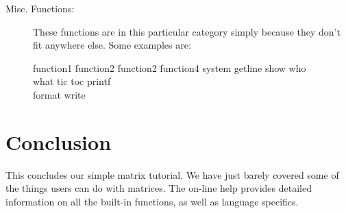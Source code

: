 \begin{description}
     \item[Misc. Functions:] These functions are in this particular
           category simply because they don't fit anywhere else. Some
           examples are:

           \begin{tabbing}
             function1 \= function2 \= function2 \= function4 \kill        
             system \> getline \> show \> who \\
             what \> tic \> toc \> printf \\
             format \> write \> \> \\
           \end{tabbing}

   \end{description}
           
\section{Conclusion}

   This concludes our simple matrix tutorial. We have just barely
   covered some of the things users can do with matrices. The on-line
   help provides detailed information on all the built-in functions,
   as well as language specifics.


